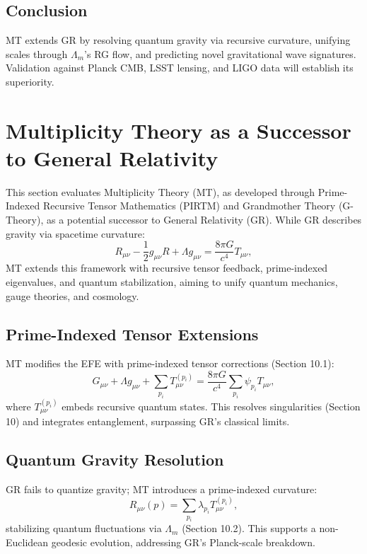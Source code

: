 \documentclass{article}
\theoremstyle{plain}
\begin{document}
\subsection{Conclusion}
MT extends GR by resolving quantum gravity via recursive curvature, unifying scales through \(\Lambda_m\)'s RG flow, and predicting novel gravitational wave signatures. Validation against Planck CMB, LSST lensing, and LIGO data will establish its superiority.

\section{Multiplicity Theory as a Successor to General Relativity}
This section evaluates Multiplicity Theory (MT), as developed through Prime-Indexed Recursive Tensor Mathematics (PIRTM) and Grandmother Theory (G-Theory), as a potential successor to General Relativity (GR). While GR describes gravity via spacetime curvature:
\begin{equation}
R_{\mu \nu} - \frac{1}{2} g_{\mu \nu} R + \Lambda g_{\mu \nu} = \frac{8 \pi G}{c^4} T_{\mu \nu},
\end{equation}
MT extends this framework with recursive tensor feedback, prime-indexed eigenvalues, and quantum stabilization, aiming to unify quantum mechanics, gauge theories, and cosmology.

\subsection{Prime-Indexed Tensor Extensions}
MT modifies the EFE with prime-indexed tensor corrections (Section 10.1):
\begin{equation}
G_{\mu \nu} + \Lambda g_{\mu \nu} + \sum_{p_i} T_{\mu \nu}^{(p_i)} = \frac{8 \pi G}{c^4} \sum_{p_i} \psi_{p_i} T_{\mu \nu},
\end{equation}
where \( T_{\mu \nu}^{(p_i)} \) embeds recursive quantum states. This resolves singularities (Section 10) and integrates entanglement, surpassing GR’s classical limits.

\subsection{Quantum Gravity Resolution}
GR fails to quantize gravity; MT introduces a prime-indexed curvature:
\begin{equation}
R_{\mu \nu}(p) = \sum_{p_i} \lambda_{p_i} T_{\mu \nu}^{(p_i)},
\end{equation}
stabilizing quantum fluctuations via \(\Lambda_m\) (Section 10.2). This supports a non-Euclidean geodesic evolution, addressing GR’s Planck-scale breakdown.
\end{document}
